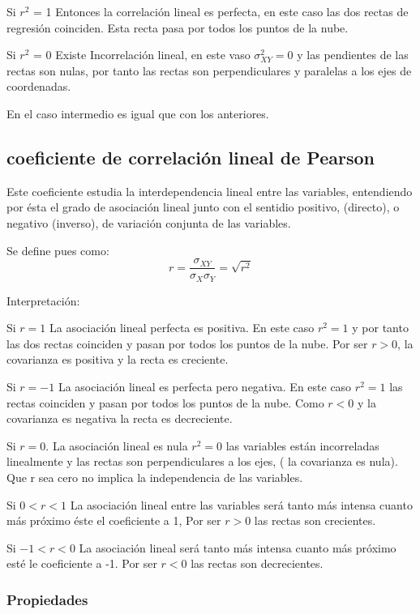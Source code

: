\documentclass{article}
\begin{document}
Si $r^2$ = 1 Entonces la correlación lineal es perfecta, en este caso las dos rectas de regresión coinciden. Esta recta pasa por todos los puntos de la nube.

Si $r^2$ = 0 Existe Incorrelación lineal, en este vaso $\sigma_{XY}^2 = 0$ y las pendientes de las rectas son nulas, por tanto las rectas son perpendiculares y paralelas a los ejes de coordenadas.

En el caso intermedio es igual que con los anteriores.

\subsection{coeficiente de correlación lineal de Pearson}

Este coeficiente estudia la interdependencia lineal entre las variables, entendiendo por ésta el grado de asociación lineal junto con el sentidio positivo, (directo), o negativo (inverso), de variación conjunta de las variables.

Se define pues como:
$$ r = \frac{\sigma_{XY}}{\sigma_{X} \sigma_{Y}}  = \sqrt{r^2}$$

Interpretación:

Si $r = 1$ La asociación lineal perfecta es positiva. En este caso $r^2 = 1$ y por tanto las dos rectas coinciden y pasan por todos los puntos de la nube. Por ser $r > 0$, la covarianza es positiva y la recta es creciente.

Si $r= -1$ La asociación lineal es perfecta pero negativa. En este caso $r^2 = 1$ las rectas coinciden y pasan por todos los puntos de la nube. Como $r < 0$ y la covarianza es negativa la recta es decreciente.


Si $r = 0$. La asociación lineal es nula $r^2 = 0$ las variables están incorreladas linealmente y las rectas son perpendiculares a los ejes, ( la covarianza es nula).  Que r sea cero no implica la independencia de las variables.

Si $ 0 < r < 1 $ La asociación lineal entre las variables será tanto más intensa cuanto más próximo éste el coeficiente a 1, Por ser $ r > 0 $ las rectas son crecientes.

Si $ -1 < r < 0 $ La asociación lineal será tanto más intensa cuanto más próximo esté le coeficiente a -1. Por ser $ r < 0$ las rectas son decrecientes.

\subsubsection{Propiedades}
\end{document}
